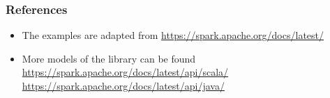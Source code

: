 \documentclass{beamer}
\begin{document}


\begin{frame}[fragile]
\frametitle{References}


\begin{itemize}
\item The examples are adapted from
  \url{https://spark.apache.org/docs/latest/}
\item More models of the library can be found 
 \url{https://spark.apache.org/docs/latest/api/scala/}
 \url{https://spark.apache.org/docs/latest/api/java/}

\end{itemize}


\end{frame}

\end{document}
